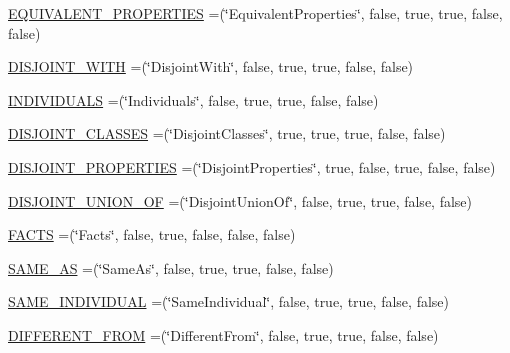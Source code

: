 \begin{DoxyCompactItemize}
\hyperlink{enumorg_1_1coode_1_1owlapi_1_1manchesterowlsyntax_1_1_manchester_o_w_l_syntax_ae2219626661e40ab3d30be1aa2f4430d}{E\-Q\-U\-I\-V\-A\-L\-E\-N\-T\-\_\-\-P\-R\-O\-P\-E\-R\-T\-I\-E\-S} =(\char`\"{}Equivalent\-Properties\char`\"{}, false, true, true, false, false)
\item 
\hyperlink{enumorg_1_1coode_1_1owlapi_1_1manchesterowlsyntax_1_1_manchester_o_w_l_syntax_a9ecba3c27beaaa4aae202ebbf6a12ea3}{D\-I\-S\-J\-O\-I\-N\-T\-\_\-\-W\-I\-T\-H} =(\char`\"{}Disjoint\-With\char`\"{}, false, true, true, false, false)
\item 
\hyperlink{enumorg_1_1coode_1_1owlapi_1_1manchesterowlsyntax_1_1_manchester_o_w_l_syntax_a1289c5c3ea9ee0e9a446548efe96bb4e}{I\-N\-D\-I\-V\-I\-D\-U\-A\-L\-S} =(\char`\"{}Individuals\char`\"{}, false, true, true, false, false)
\item 
\hyperlink{enumorg_1_1coode_1_1owlapi_1_1manchesterowlsyntax_1_1_manchester_o_w_l_syntax_a06d6c92cad37d39ff43d3edfe6089239}{D\-I\-S\-J\-O\-I\-N\-T\-\_\-\-C\-L\-A\-S\-S\-E\-S} =(\char`\"{}Disjoint\-Classes\char`\"{}, true, true, true, false, false)
\item 
\hyperlink{enumorg_1_1coode_1_1owlapi_1_1manchesterowlsyntax_1_1_manchester_o_w_l_syntax_a1856e0f41590589b48c388ba5fef15b3}{D\-I\-S\-J\-O\-I\-N\-T\-\_\-\-P\-R\-O\-P\-E\-R\-T\-I\-E\-S} =(\char`\"{}Disjoint\-Properties\char`\"{}, true, false, true, false, false)
\item 
\hyperlink{enumorg_1_1coode_1_1owlapi_1_1manchesterowlsyntax_1_1_manchester_o_w_l_syntax_a88a08d4aea01f3741561a2626a6c3e87}{D\-I\-S\-J\-O\-I\-N\-T\-\_\-\-U\-N\-I\-O\-N\-\_\-\-O\-F} =(\char`\"{}Disjoint\-Union\-Of\char`\"{}, false, true, true, false, false)
\item 
\hyperlink{enumorg_1_1coode_1_1owlapi_1_1manchesterowlsyntax_1_1_manchester_o_w_l_syntax_a06629b67990cff1eb7191552a723ab7b}{F\-A\-C\-T\-S} =(\char`\"{}Facts\char`\"{}, false, true, false, false, false)
\item 
\hyperlink{enumorg_1_1coode_1_1owlapi_1_1manchesterowlsyntax_1_1_manchester_o_w_l_syntax_a60495a25fba538357f38a0dcfe2908d8}{S\-A\-M\-E\-\_\-\-A\-S} =(\char`\"{}Same\-As\char`\"{}, false, true, true, false, false)
\item 
\hyperlink{enumorg_1_1coode_1_1owlapi_1_1manchesterowlsyntax_1_1_manchester_o_w_l_syntax_a9127bb38702502035b10b496af497aa7}{S\-A\-M\-E\-\_\-\-I\-N\-D\-I\-V\-I\-D\-U\-A\-L} =(\char`\"{}Same\-Individual\char`\"{}, false, true, true, false, false)
\item 
\hyperlink{enumorg_1_1coode_1_1owlapi_1_1manchesterowlsyntax_1_1_manchester_o_w_l_syntax_a3d61b898e5bc6f67b41f142dbe9755ab}{D\-I\-F\-F\-E\-R\-E\-N\-T\-\_\-\-F\-R\-O\-M} =(\char`\"{}Different\-From\char`\"{}, false, true, true, false, false)

\end{DoxyCompactItemize}
